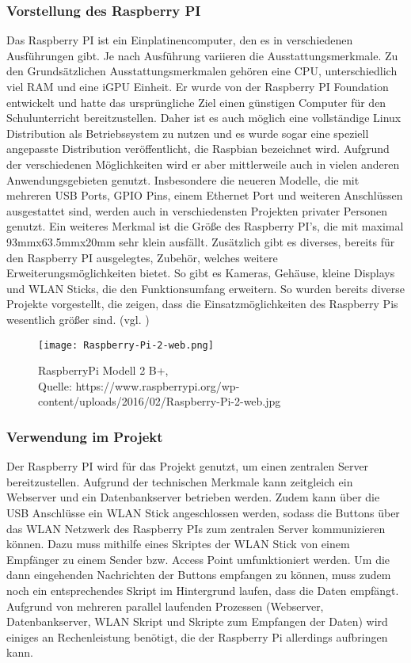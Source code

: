 
\subsubsection{Vorstellung des Raspberry PI}        
\label{sec:Vorstellung des Raspberry PI-1} 

Das Raspberry PI ist ein Einplatinencomputer, den es in verschiedenen Ausführungen gibt. Je nach Ausführung variieren die Ausstattungsmerkmale. Zu den Grundsätzlichen Ausstattungsmerkmalen gehören eine CPU, unterschiedlich viel RAM und eine iGPU Einheit. Er wurde von der Raspberry PI Foundation entwickelt und hatte das ursprüngliche Ziel einen günstigen Computer für den Schulunterricht bereitzustellen. Daher ist es auch möglich eine vollständige Linux Distribution als Betriebssystem zu nutzen und es wurde sogar eine speziell angepasste Distribution veröffentlicht, die Raspbian bezeichnet wird. 
Aufgrund der verschiedenen Möglichkeiten wird er aber mittlerweile auch in vielen anderen Anwendungsgebieten genutzt. Insbesondere die neueren Modelle, die mit mehreren USB Ports, \ac{GPIO} Pins, einem Ethernet Port und weiteren Anschlüssen ausgestattet sind, werden auch in verschiedensten Projekten privater Personen genutzt. Ein weiteres Merkmal ist die Größe des Raspberry PI's, die mit maximal 93mmx63.5mmx20mm sehr klein ausfällt. Zusätzlich gibt es diverses, bereits für den Raspberry PI ausgelegtes, Zubehör, welches weitere Erweiterungsmöglichkeiten bietet. So gibt es Kameras, Gehäuse, kleine Displays und WLAN Sticks, die den Funktionsumfang erweitern. So wurden bereits diverse Projekte vorgestellt, die zeigen, dass die Einsatzmöglichkeiten des Raspberry Pis wesentlich größer sind. (vgl. \cite{.28.12.2016} \cite{.28.01.2017})
\\
\begin{figure}[!htb]
	\centering
	\texttt{[image: Raspberry-Pi-2-web.png]}
	\caption[RaspberryPi Modell 2 B]{RaspberryPi Modell 2 B+,\\ Quelle: https://www.raspberrypi.org/wp-content/uploads/2016/02/Raspberry-Pi-2-web.jpg}
\end{figure}


\subsubsection{Verwendung im Projekt}        
\label{sec:Verwendung des Raspberry PI-1} 
Der Raspberry PI wird für das Projekt genutzt, um einen zentralen Server bereitzustellen. Aufgrund der technischen Merkmale kann zeitgleich ein Webserver und ein Datenbankserver betrieben werden. Zudem kann über die USB Anschlüsse ein WLAN Stick angeschlossen werden, sodass die Buttons über das WLAN Netzwerk des Raspberry PIs zum zentralen Server kommunizieren können. Dazu muss mithilfe eines Skriptes der WLAN Stick von einem Empfänger zu einem Sender bzw. Access Point umfunktioniert werden. Um die dann eingehenden Nachrichten der Buttons empfangen zu können, muss zudem noch ein entsprechendes Skript im Hintergrund laufen, dass die Daten empfängt. Aufgrund von mehreren parallel laufenden Prozessen (Webserver, Datenbankserver, WLAN Skript und Skripte zum Empfangen der Daten) wird einiges an Rechenleistung benötigt, die der Raspberry Pi allerdings aufbringen kann. 

